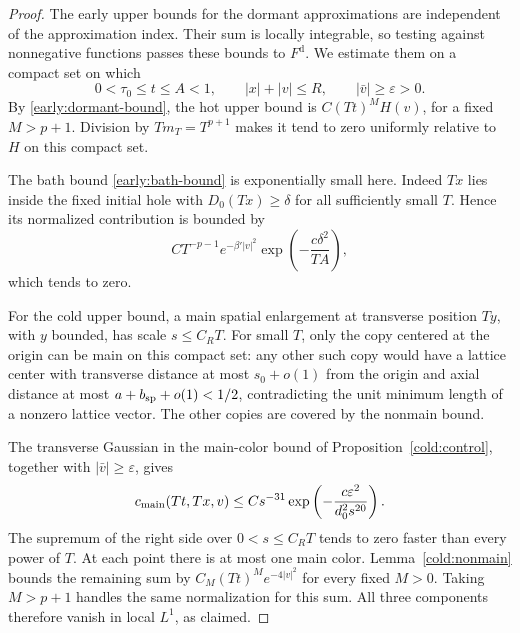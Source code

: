 \begin{proof}
The early upper bounds for the dormant approximations are independent
of the approximation index. Their sum is locally integrable, so testing
against nonnegative functions passes these bounds to \(F^{\mathrm d}\).
We estimate them on a compact set on which
\[
 0<\tau_0\le t\le A<1,\qquad |x|+|v|\le R,
                  \qquad |\bar v|\ge\varepsilon>0.
\]
By \eqref{early:dormant-bound}, the hot upper bound is
\(C(Tt)^M H(v)\), for a fixed \(M>p+1\). Division by
\(T m_T=T^{p+1}\) makes it tend to zero uniformly relative to
\(H\) on this compact set.

The bath bound \eqref{early:bath-bound} is exponentially small here.
Indeed \(Tx\) lies inside the fixed initial hole with
\(D_0(Tx)\ge\delta\) for all sufficiently small \(T\). Hence its
normalized contribution is bounded by
\[
 C T^{-p-1}e^{-\beta'|v|^2}
       \exp\left(-\frac{c\delta^2}{TA}\right),
\]
which tends to zero.

For the cold upper bound, a main spatial enlargement at transverse
position \(Ty\), with \(y\) bounded, has scale \(s\le C_R T\).
For small \(T\), only the copy centered at the origin can be main
on this compact set: any other such copy would have a lattice center
with transverse distance at most \(s_0+o(1)\) from the origin and
axial distance at most \(a+b_{\rm sp}+o(1)<1/2\), contradicting
the unit minimum length of a nonzero lattice vector. The other copies
are covered by the nonmain bound.

The transverse Gaussian in the main-color bound of
Proposition~\ref{cold:control}, together with \(|\bar v|\ge\varepsilon\),
gives
\[
 c_{\rm main}(Tt,Tx,v)
 \le C s^{-31}
       \exp\left(-\frac{c\varepsilon^2}{d_0^2s^{20}}\right).
\]
The supremum of the right side over \(0<s\le C_R T\) tends to
zero faster than every power of \(T\). At each point there is at
most one main color. Lemma~\ref{cold:nonmain} bounds the remaining
sum by \(C_M(Tt)^M e^{-4|v|^2}\) for every fixed \(M>0\).
Taking \(M>p+1\) handles the same normalization for this sum.
All three components therefore vanish in local \(L^1\), as claimed.
\end{proof}


